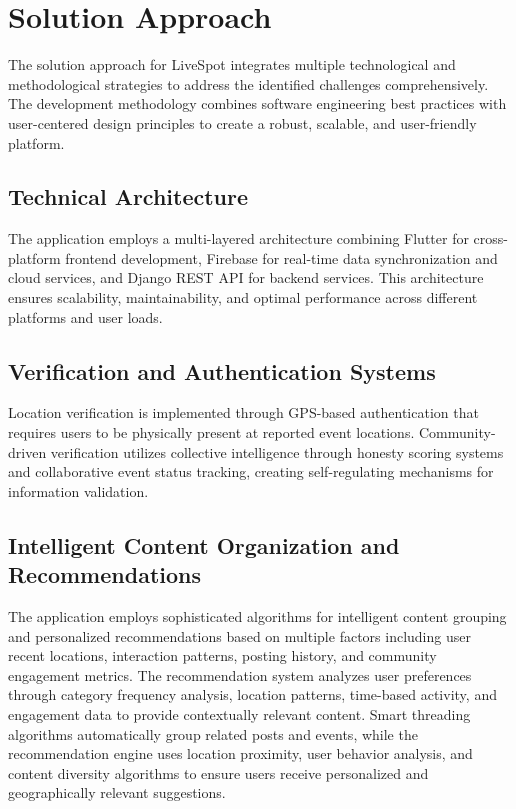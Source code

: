 \section{Solution Approach}
\label{sec:intro_sol}

The solution approach for LiveSpot integrates multiple technological and methodological strategies to address the identified challenges comprehensively. The development methodology combines software engineering best practices with user-centered design principles to create a robust, scalable, and user-friendly platform.

\subsection{Technical Architecture}
\label{sec:intro_tech_arch}

The application employs a multi-layered architecture combining Flutter for cross-platform frontend development, Firebase for real-time data synchronization and cloud services, and Django REST API for backend services. This architecture ensures scalability, maintainability, and optimal performance across different platforms and user loads.

\subsection{Verification and Authentication Systems}
\label{sec:intro_verification}

Location verification is implemented through GPS-based authentication that requires users to be physically present at reported event locations. Community-driven verification utilizes collective intelligence through honesty scoring systems and collaborative event status tracking, creating self-regulating mechanisms for information validation.

\subsection{Intelligent Content Organization and Recommendations}
\label{sec:intro_intelligent_content}

The application employs sophisticated algorithms for intelligent content grouping and personalized recommendations based on multiple factors including user recent locations, interaction patterns, posting history, and community engagement metrics. The recommendation system analyzes user preferences through category frequency analysis, location patterns, time-based activity, and engagement data to provide contextually relevant content. Smart threading algorithms automatically group related posts and events, while the recommendation engine uses location proximity, user behavior analysis, and content diversity algorithms to ensure users receive personalized and geographically relevant suggestions.


